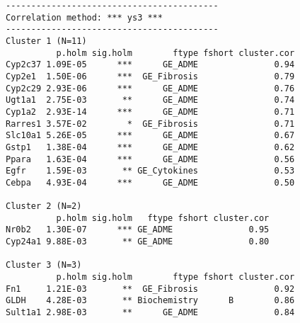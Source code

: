 \documentclass[]{article}
\begin{document}
\begin{verbatim}
------------------------------------------
Correlation method: *** ys3 ***
------------------------------------------
Cluster 1 (N=11)
          p.holm sig.holm        ftype fshort cluster.cor
Cyp2c37 1.09E-05      ***      GE_ADME               0.94
Cyp2e1  1.50E-06      ***  GE_Fibrosis               0.79
Cyp2c29 2.93E-06      ***      GE_ADME               0.76
Ugt1a1  2.75E-03       **      GE_ADME               0.74
Cyp1a2  2.93E-14      ***      GE_ADME               0.71
Rarres1 3.57E-02        *  GE_Fibrosis               0.71
Slc10a1 5.26E-05      ***      GE_ADME               0.67
Gstp1   1.38E-04      ***      GE_ADME               0.62
Ppara   1.63E-04      ***      GE_ADME               0.56
Egfr    1.59E-03       ** GE_Cytokines               0.53
Cebpa   4.93E-04      ***      GE_ADME               0.50

Cluster 2 (N=2)
          p.holm sig.holm   ftype fshort cluster.cor
Nr0b2   1.30E-07      *** GE_ADME               0.95
Cyp24a1 9.88E-03       ** GE_ADME               0.80

Cluster 3 (N=3)
          p.holm sig.holm        ftype fshort cluster.cor
Fn1     1.21E-03       **  GE_Fibrosis               0.92
GLDH    4.28E-03       ** Biochemistry      B        0.86
Sult1a1 2.98E-03       **      GE_ADME               0.84


\end{verbatim}
\end{document}
